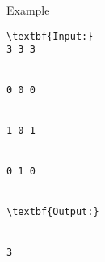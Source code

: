 Example
\begin{verbatim}
\textbf{Input:}
3 3 3


0 0 0


1 0 1


0 1 0


\textbf{Output:}


3
\end{verbatim}